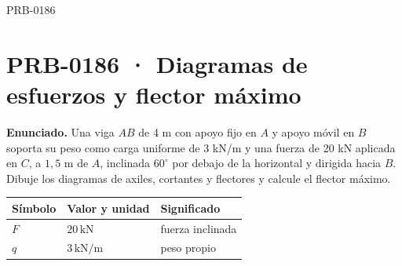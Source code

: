 \begin{studiumworked}{PRB-0186}

\section{PRB-0186 · Diagramas de esfuerzos y flector máximo}

\textbf{Enunciado.} Una viga $AB$ de 4 m con apoyo fijo en $A$ y apoyo móvil en $B$ soporta su peso como carga uniforme de 3 kN/m y una fuerza de 20 kN aplicada en $C$, a $1{,}5$ m de $A$, inclinada $60^{\circ}$ por debajo de la horizontal y dirigida hacia $B$. Dibuje los diagramas de axiles, cortantes y flectores y calcule el flector máximo.

\par\medskip\noindent\begin{tabular}{@{}p{.18\linewidth}p{.26\linewidth}p{.48\linewidth}@{}}
\toprule Símbolo & Valor y unidad & Significado\\\midrule
$F$ & $20\,\mathrm{kN}$ & fuerza inclinada\\
$q$ & $3\,\mathrm{kN/m}$ & peso propio\\
\bottomrule\end{tabular}\par\medskip


\end{studiumworked}
